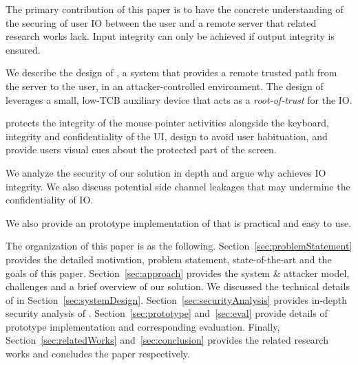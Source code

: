 \begin{mybullet}
  \item The primary contribution of this paper is to have the concrete understanding of the securing of user IO between the user and  a remote server that related research works lack. Input integrity can only be achieved if output integrity is ensured.
  \item We describe the design of \name, a system that provides a remote trusted path from the server to the user, in an attacker-controlled environment. The design of \name leverages a small, low-TCB auxiliary device that acts as a \emph{root-of-trust} for the IO.
  \item \name protects the integrity of the mouse pointer activities alongside the keyboard, integrity and confidentiality of the UI, design to avoid user habituation, and provide users visual cues about the protected part of the screen. 
  \item We analyze the security of our solution in depth and argue why \name achieves IO integrity. We also discuss potential side channel leakages that may undermine the confidentiality of IO. 
  \item We also provide an prototype implementation of \name that is practical and easy to use.
\end{mybullet}


 The organization of this paper is as the following. Section~\ref{sec:problemStatement} provides the detailed motivation, problem statement, state-of-the-art and the goals of this paper. Section~\ref{sec:approach} provides the system \& attacker model, challenges and a brief overview of our solution. We discussed the technical details of \name in Section~\ref{sec:systemDesign}. Section~\ref{sec:securityAnalysis} provides in-depth security analysis of \name. Section~\ref{sec:prototype} and~\ref{sec:eval} provide details of \name prototype implementation and corresponding evaluation. Finally, Section~\ref{sec:relatedWorks} and~\ref{sec:conclusion} provides the related research works and concludes the paper respectively.



